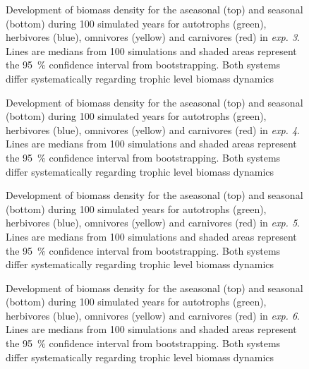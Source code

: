 \begin{appendices}
\clearpage


\begin{figure}[h!]
\centering

\caption[Log-body mass density time series for \textit{exp. 3} in both systems]{Development of biomass density for the aseasonal (top) and seasonal (bottom) during 100 simulated years for autotrophs (green), herbivores (blue), omnivores (yellow) and carnivores (red) in \textit{exp. 3}. Lines are medians from 100 simulations and shaded areas represent the 95~\% confidence interval from bootstrapping. Both systems differ systematically regarding trophic level biomass dynamics}
\label{fig:chap:res:ts:expno3}
\end{figure}

\clearpage

\begin{figure}[h!]
\centering

\caption[Log-body mass density time series for \textit{exp. 4} in both systems]{Development of biomass density for the aseasonal (top) and seasonal (bottom) during 100 simulated years for autotrophs (green), herbivores (blue), omnivores (yellow) and carnivores (red) in \textit{exp. 4}. Lines are medians from 100 simulations and shaded areas represent the 95~\% confidence interval from bootstrapping. Both systems differ systematically regarding trophic level biomass dynamics}
\label{fig:chap:res:ts:expno4}
\end{figure}

\clearpage


\begin{figure}[h!]
\centering

\caption[Log-body mass density time series for \textit{exp. 5} in both systems]{Development of biomass density for the aseasonal (top) and seasonal (bottom) during 100 simulated years for autotrophs (green), herbivores (blue), omnivores (yellow) and carnivores (red) in \textit{exp. 5}. Lines are medians from 100 simulations and shaded areas represent the 95~\% confidence interval from bootstrapping. Both systems differ systematically regarding trophic level biomass dynamics}
\label{fig:chap:res:ts:expno5}
\end{figure}

\clearpage


\begin{figure}[h!]
\centering

\caption[Log-body mass density time series for \textit{exp. 6} in both systems]{Development of biomass density for the aseasonal (top) and seasonal (bottom) during 100 simulated years for autotrophs (green), herbivores (blue), omnivores (yellow) and carnivores (red) in \textit{exp. 6}. Lines are medians from 100 simulations and shaded areas represent the 95~\% confidence interval from bootstrapping. Both systems differ systematically regarding trophic level biomass dynamics}
\label{fig:chap:res:ts:expno6}
\end{figure}


\end{appendices}
